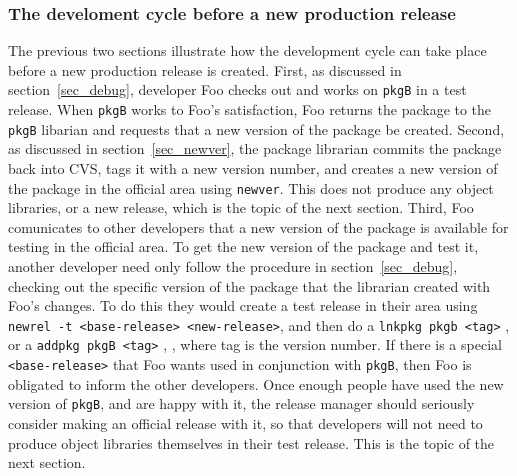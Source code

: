 \documentclass[12pt]{article}
\begin{document}
\subsubsection{The develoment cycle before a new production release}
\label{sec_dev_cycle}
The previous two sections illustrate how the development cycle can take 
place before a new production release is created.  First, as discussed in
section~\ref{sec_debug}, developer Foo checks out and works on \texttt{pkgB}
in a test release. When \texttt{pkgB} works to Foo's satisfaction, Foo returns
the package  to the \texttt{pkgB} libarian and requests that a new version of
the package be created.  Second, as discussed in section~\ref{sec_newver}, the
package  librarian commits the package back into CVS, tags it with a new 
version number, and creates a new version of the package in the official area
using \texttt{newver}.  This does not produce any object libraries, or a new
release, which is the topic of the next section.  Third, Foo comunicates to
other developers that a new version of the package is available for testing
in the official area.  To get the new version of the package and test it, 
another developer need only follow the procedure in section~\ref{sec_debug},
checking out the specific version of the package that the librarian created
with Foo's changes.  To do this they would create a test release in their area
using \texttt{newrel -t <base-release> <new-release>}, 
 and then do a 
\texttt{lnkpkg pkgb <tag>} 
, 
or a \texttt{addpkg pkgB <tag>}
, 
, 
where tag is the 
version number.  If there is 
a special \texttt{<base-release>} that Foo wants used in conjunction with 
\texttt{pkgB}, then Foo is obligated to inform the other developers.  Once 
enough people have used the new version of \texttt{pkgB}, and are happy with
it, the release manager should seriously consider making an official release
with it, so that developers will not need to produce object libraries
themselves in their test release.  This is the topic of the next section.
\end{document}
